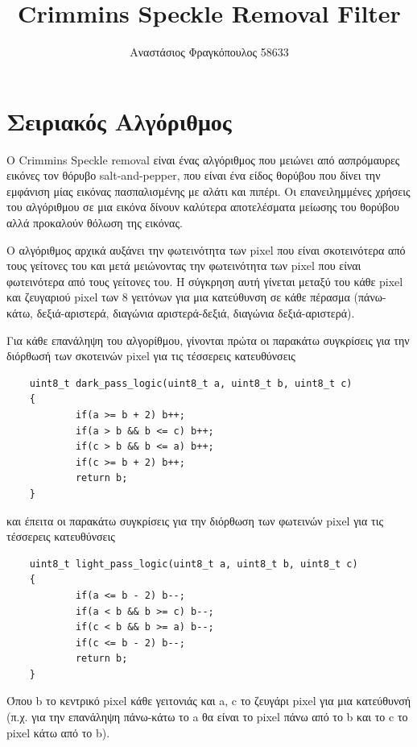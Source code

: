 \documentclass[12pt]{article}
\begin{document}
\title{Crimmins Speckle Removal Filter}
\author{Αναστάσιος Φραγκόπουλος 58633}
\date{}




\section{Σειριακός Αλγόριθμος}

Ο Crimmins Speckle removal είναι ένας αλγόριθμος που μειώνει από ασπρόμαυρες εικόνες τον θόρυβο salt-and-pepper, που είναι ένα είδος θορύβου που δίνει την εμφάνιση μίας εικόνας πασπαλισμένης με αλάτι και πιπέρι. Οι επανειλημμένες χρήσεις του αλγόριθμου σε μια εικόνα δίνουν καλύτερα αποτελέσματα μείωσης του θορύβου αλλά προκαλούν θόλωση της εικόνας.

Ο αλγόριθμος αρχικά αυξάνει την φωτεινότητα των pixel που είναι σκοτεινότερα από τους γείτονες του και μετά μειώνοντας την φωτεινότητα των pixel που είναι φωτεινότερα από τους γείτονες του. Η σύγκρηση αυτή γίνεται μεταξύ του κάθε pixel και ζευγαριού pixel των 8 γειτόνων για μια κατεύθυνση σε κάθε πέρασμα (πάνω-κάτω, δεξιά-αριστερά, διαγώνια αριστερά-δεξιά, διαγώνια δεξιά-αριστερά).

Για κάθε επανάληψη του αλγορίθμου, γίνονται πρώτα οι παρακάτω συγκρίσεις για την διόρθωσή των σκοτεινών pixel για τις τέσσερεις κατευθύνσεις

\begin{verbatim}
    uint8_t dark_pass_logic(uint8_t a, uint8_t b, uint8_t c)
    {
            if(a >= b + 2) b++;
            if(a > b && b <= c) b++;
            if(c > b && b <= a) b++;
            if(c >= b + 2) b++;
            return b;
    }
\end{verbatim}

και έπειτα οι παρακάτω συγκρίσεις για την διόρθωση των φωτεινών pixel για τις τέσσερεις κατευθύνσεις

\begin{verbatim}
    uint8_t light_pass_logic(uint8_t a, uint8_t b, uint8_t c)
    {
            if(a <= b - 2) b--;
            if(a < b && b >= c) b--;
            if(c < b && b >= a) b--;
            if(c <= b - 2) b--;
            return b;
    }
\end{verbatim}

Όπου b το κεντρικό pixel κάθε γειτονιάς και a, c το ζευγάρι pixel για μια κατεύθυνσή (π.χ. για την επανάληψη πάνω-κάτω το a θα είναι το pixel πάνω από το b και το c το pixel κάτω από το b).\\
\end{document}
